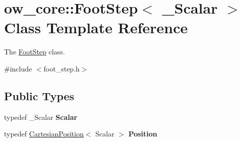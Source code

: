 \hypertarget{classow__core_1_1FootStep}{}\section{ow\+\_\+core\+:\+:Foot\+Step$<$ \+\_\+\+Scalar $>$ Class Template Reference}
\label{classow__core_1_1FootStep}


The \hyperlink{classow__core_1_1FootStep}{Foot\+Step} class.  




{\ttfamily \#include $<$foot\+\_\+step.\+h$>$}

\subsection*{Public Types}
\begin{DoxyCompactItemize}
\item 
typedef \+\_\+\+Scalar {\bfseries Scalar}\hypertarget{classow__core_1_1FootStep_a0ae45689b0344846b003329254f57e7c}{}\label{classow__core_1_1FootStep_a0ae45689b0344846b003329254f57e7c}

\item 
typedef \hyperlink{classow__core_1_1CartesianPosition}{Cartesian\+Position}$<$ Scalar $>$ {\bfseries Position}\hypertarget{classow__core_1_1FootStep_af2cb40f95ccc6465d54e908ea38b03e1}{}\label{classow__core_1_1FootStep_af2cb40f95ccc6465d54e908ea38b03e1}

\end{DoxyCompactItemize}
